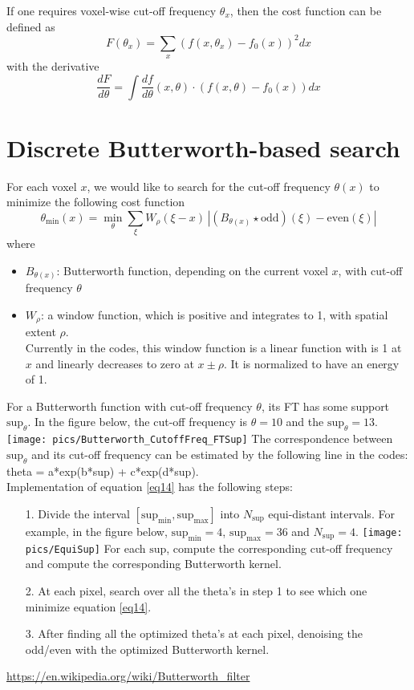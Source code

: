 \documentclass{article}
\begin{document}
\noindent If one requires voxel-wise cut-off frequency $\theta_x$, then the cost function can be defined as
\begin{equation}\label{eq12}
F(\theta_x) = \sum_x (f(x,\theta_x) - f_0(x))^2dx
\end{equation}
with the derivative
\begin{equation}\label{eq13}
\frac{dF}{d\theta} = \int \frac{df}{d\theta}(x,\theta) \cdot (f(x,\theta) - f_0(x))dx
\end{equation}

\newpage
\section{Discrete Butterworth-based search}
For each voxel $x$, we would like to search for the cut-off frequency $\theta(x)$ to minimize the following cost function
\begin{equation}\label{eq14}
\theta_{\min}(x) = \min_{\theta}\sum_\xi W_\rho(\xi-x) \, |(B_{\theta(x)} \star \text{odd})(\xi) - \text{even}(\xi) |
\end{equation}
where
\begin{itemize}
\item $B_{\theta(x)}$: Butterworth function, depending on the current voxel $x$, with cut-off frequency $\theta$
\item $W_\rho$: a window function, which is positive and integrates to 1, with spatial extent $\rho$.\\
Currently in the codes, this window function is a linear function with is 1 at $x$ and linearly decreases to zero at $x \pm \rho$. It is normalized to have an energy of 1.
\end{itemize}
For a Butterworth function with cut-off frequency $\theta$, its FT has some support $\text{sup}_\theta$. In the figure below, the cut-off frequency is $\theta = 10$ and the $\text{sup}_\theta = 13$.
\texttt{[image: pics/Butterworth\_CutoffFreq\_FTSup]}
The correspondence between $\text{sup}_\theta$ and its cut-off frequency can be estimated by the following line in the codes: theta = a*exp(b*sup) + c*exp(d*sup).\\

\noindent Implementation of equation \eqref{eq14} has the following steps:
\begin{itemize}
\item[1.] Divide the interval $[\text{sup}_{\min}, \text{sup}_{\max}]$ into $N_\text{sup}$ equi-distant intervals. For example, in the figure below, $\text{sup}_{\min} = 4$, $\text{sup}_{\max} = 36$ and $N_\text{sup} = 4$.
\texttt{[image: pics/EquiSup]}
For each $\text{sup}$, compute the corresponding cut-off frequency and compute the corresponding Butterworth kernel.
\item[2.] At each pixel, search over all the theta's in step 1 to see which one minimize equation \eqref{eq14}.
\item[3.] After finding all the optimized theta's at each pixel, denoising the odd/even with the optimized Butterworth kernel.
\end{itemize}

\begin{thebibliography}{9}
 \url{https://en.wikipedia.org/wiki/Butterworth_filter}
\end{thebibliography}
\end{document}

